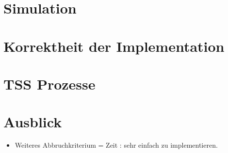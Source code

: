 \documentclass[11pt, a4paper, german]{article}
\begin{document}
\section{Simulation}

\section{Korrektheit der Implementation}

\section{TSS Prozesse}

\section{Ausblick}

\begin{itemize}
	\item Weiteres Abbruchkriterium = Zeit : sehr einfach zu implementieren.
\end{itemize}


\end{document}
